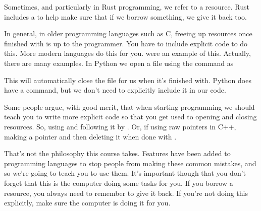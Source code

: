 \documentclass[letterpaper,10pt,british]{sphinxmanual}
\begin{document}
\sphinxAtStartPar
Sometimes, and particularly in Rust programming, we refer to  a resource. Rust includes a  to help make sure that if we borrow something, we give it back too.

\sphinxAtStartPar
In general, in older programming languages such as C, freeing up resources once finished with is up to the programmer. You have to include explicit code to do this. More modern languages do this for you. {\hyperref[\detokenize{chapters/programming_fundamentals/pointers:smart-pointers}]{}} were an example of this. Actually, there are many examples. In Python we open a file using the  command as

\begin{sphinxVerbatim}[commandchars=\\\{\}]
  
   
\end{sphinxVerbatim}

\sphinxAtStartPar
This will automatically close the file for us when it’s finished with. Python does have a  command, but we don’t need to explicitly include it in our code.

\sphinxAtStartPar
Some people argue, with good merit, that when starting programming we should teach you to write more explicit code so that you get used to opening and closing resources. So, using  and following it by . Or, if using raw pointers in C++, making a pointer  and then deleting it when done with .

\sphinxAtStartPar
That’s not the philosophy this course takes. Features have been added to programming languages to stop people from making these common mistakes, and so we’re going to teach you to use them. It’s important though that you don’t forget that this is the computer doing some tasks for you. If you borrow a resource, you always need to remember to give it back. If you’re not doing this explicitly, make sure the computer is doing it for you.
\end{document}
